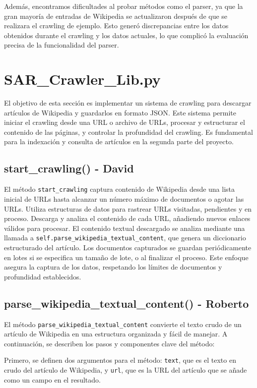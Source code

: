 \documentclass[12pt,a4paper]{article}
\begin{document}
Además, encontramos dificultades al probar métodos como el parser, ya que la gran mayoría de entradas de Wikipedia se actualizaron después de que se realizara el crawling de ejemplo. Esto generó discrepancias entre los datos obtenidos durante el crawling y los datos actuales, lo que complicó la evaluación precisa de la funcionalidad del parser.

\section{SAR\_Crawler\_Lib.py}

El objetivo de esta sección es implementar un sistema de crawling para descargar artículos de Wikipedia y guardarlos en formato JSON. Este sistema permite iniciar el crawling desde una URL o archivo de URLs, procesar y estructurar el contenido de las páginas, y controlar la profundidad del crawling. Es fundamental para la indexación y consulta de artículos en la segunda parte del proyecto.

\subsection{start\_crawling() - David}
El método \texttt{start\_crawling} captura contenido de Wikipedia desde una lista inicial de URLs hasta alcanzar un número máximo de documentos o agotar las URLs. Utiliza estructuras de datos para rastrear URLs visitadas, pendientes y en proceso. Descarga y analiza el contenido de cada URL, añadiendo nuevos enlaces válidos para procesar. El contenido textual descargado se analiza mediante una llamada a \texttt{self.parse\_wikipedia\_textual\_content}, que genera un diccionario estructurado del artículo. Los documentos capturados se guardan periódicamente en lotes si se especifica un tamaño de lote, o al finalizar el proceso. Este enfoque asegura la captura de los datos, respetando los límites de documentos y profundidad establecidos.

\subsection{parse\_wikipedia\_textual\_content() - Roberto}
El método \texttt{parse\_wikipedia\_textual\_content} convierte el texto crudo de un artículo de Wikipedia en una estructura organizada y fácil de manejar. A continuación, se describen los pasos y componentes clave del método:

Primero, se definen dos argumentos para el método: \texttt{text}, que es el texto en crudo del artículo de Wikipedia, y \texttt{url}, que es la URL del artículo que se añade como un campo en el resultado.
\end{document}
